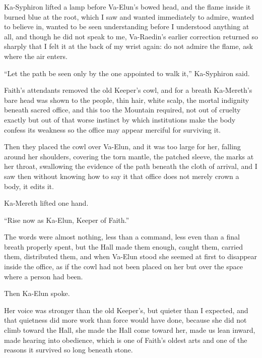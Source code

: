 Ka-Syphiron lifted a lamp before Va-Elun’s bowed head, and the flame inside it burned blue at the root, 
which I saw and wanted immediately to admire, wanted to believe in, wanted to be seen understanding before 
I understood anything at all, and though he did not speak to me, Va-Raedin’s earlier correction returned 
so sharply that I felt it at the back of my wrist again: do not admire the flame, ask where the air enters.\par

“Let the path be seen only by the one appointed to walk it,” Ka-Syphiron said.\par

Faith’s attendants removed the old Keeper’s cowl, and for a breath Ka-Mereth’s bare head was shown to the 
people, thin hair, white scalp, the mortal indignity beneath sacred office, and this too the Mountain 
required, not out of cruelty exactly but out of that worse instinct by which institutions make the body 
confess its weakness so the office may appear merciful for surviving it.\par


Then they placed the cowl over Va-Elun, and it was too large for her, falling around her shoulders, covering 
the torn mantle, the patched sleeve, the marks at her throat, swallowing the evidence of the path beneath 
the cloth of arrival, and I saw then without knowing how to say it that office does not merely crown a body, 
it edits it.\par

Ka-Mereth lifted one hand.\par
“Rise now as Ka-Elun, Keeper of Faith.”\par

The words were almost nothing, less than a command, less even than a final breath properly spent, but the 
Hall made them enough, caught them, carried them, distributed them, and when Va-Elun stood she seemed at 
first to disappear inside the office, as if the cowl had not been placed on her but over the space where 
a person had been.\par

Then Ka-Elun spoke.\par

Her voice was stronger than the old Keeper’s, but quieter than I expected, and that quietness did more 
work than force would have done, because she did not climb toward the Hall, she made the Hall come toward 
her, made us lean inward, made hearing into obedience, which is one of Faith’s oldest arts and one of 
the reasons it survived so long beneath stone.\par

